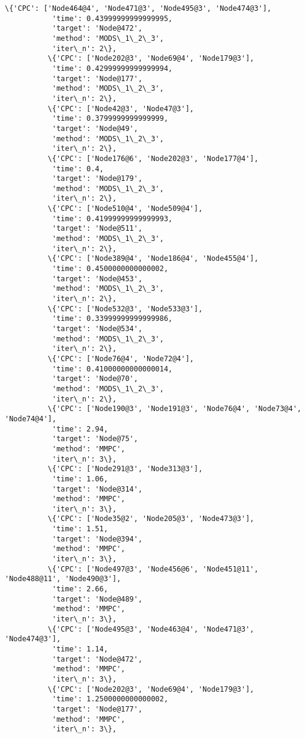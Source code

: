 \documentclass[11pt]{article}
\begin{document}
\begin{Verbatim}[commandchars=\\\{\}]
          \{'CPC': ['Node464@4', 'Node471@3', 'Node495@3', 'Node474@3'],
           'time': 0.43999999999999995,
           'target': 'Node@472',
           'method': 'MODS\_1\_2\_3',
           'iter\_n': 2\},
          \{'CPC': ['Node202@3', 'Node69@4', 'Node179@3'],
           'time': 0.42999999999999994,
           'target': 'Node@177',
           'method': 'MODS\_1\_2\_3',
           'iter\_n': 2\},
          \{'CPC': ['Node42@3', 'Node47@3'],
           'time': 0.3799999999999999,
           'target': 'Node@49',
           'method': 'MODS\_1\_2\_3',
           'iter\_n': 2\},
          \{'CPC': ['Node176@6', 'Node202@3', 'Node177@4'],
           'time': 0.4,
           'target': 'Node@179',
           'method': 'MODS\_1\_2\_3',
           'iter\_n': 2\},
          \{'CPC': ['Node510@4', 'Node509@4'],
           'time': 0.41999999999999993,
           'target': 'Node@511',
           'method': 'MODS\_1\_2\_3',
           'iter\_n': 2\},
          \{'CPC': ['Node389@4', 'Node186@4', 'Node455@4'],
           'time': 0.4500000000000002,
           'target': 'Node@453',
           'method': 'MODS\_1\_2\_3',
           'iter\_n': 2\},
          \{'CPC': ['Node532@3', 'Node533@3'],
           'time': 0.33999999999999986,
           'target': 'Node@534',
           'method': 'MODS\_1\_2\_3',
           'iter\_n': 2\},
          \{'CPC': ['Node76@4', 'Node72@4'],
           'time': 0.41000000000000014,
           'target': 'Node@70',
           'method': 'MODS\_1\_2\_3',
           'iter\_n': 2\},
          \{'CPC': ['Node190@3', 'Node191@3', 'Node76@4', 'Node73@4', 'Node74@4'],
           'time': 2.94,
           'target': 'Node@75',
           'method': 'MMPC',
           'iter\_n': 3\},
          \{'CPC': ['Node291@3', 'Node313@3'],
           'time': 1.06,
           'target': 'Node@314',
           'method': 'MMPC',
           'iter\_n': 3\},
          \{'CPC': ['Node35@2', 'Node205@3', 'Node473@3'],
           'time': 1.51,
           'target': 'Node@394',
           'method': 'MMPC',
           'iter\_n': 3\},
          \{'CPC': ['Node497@3', 'Node456@6', 'Node451@11', 'Node488@11', 'Node490@3'],
           'time': 2.66,
           'target': 'Node@489',
           'method': 'MMPC',
           'iter\_n': 3\},
          \{'CPC': ['Node495@3', 'Node463@4', 'Node471@3', 'Node474@3'],
           'time': 1.14,
           'target': 'Node@472',
           'method': 'MMPC',
           'iter\_n': 3\},
          \{'CPC': ['Node202@3', 'Node69@4', 'Node179@3'],
           'time': 1.2500000000000002,
           'target': 'Node@177',
           'method': 'MMPC',
           'iter\_n': 3\},

\end{Verbatim}
\end{document}
